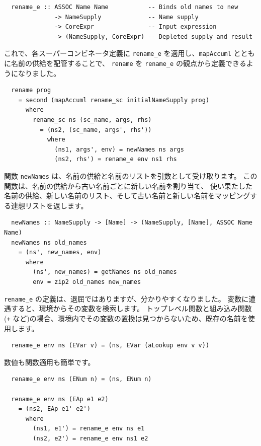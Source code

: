 \documentclass{jbook}
\begin{document}
\begin{verbatim}
  rename_e :: ASSOC Name Name           -- Binds old names to new
              -> NameSupply             -- Name supply
              -> CoreExpr               -- Input expression
              -> (NameSupply, CoreExpr) -- Depleted supply and result
\end{verbatim}

これで、各スーパーコンビネータ定義に \texttt{rename\_e} を適用し、\texttt{mapAccuml} とともに名前の供給を配管することで、
\texttt{rename} を \texttt{rename\_e} の観点から定義できるようになりました。

\begin{verbatim}
  rename prog
    = second (mapAccuml rename_sc initialNameSupply prog)
      where
        rename_sc ns (sc_name, args, rhs)
          = (ns2, (sc_name, args', rhs'))
            where
              (ns1, args', env) = newNames ns args
              (ns2, rhs') = rename_e env ns1 rhs
\end{verbatim}

関数 \texttt{newNames} は、名前の供給と名前のリストを引数として受け取ります。
この関数は、名前の供給から古い名前ごとに新しい名前を割り当て、
使い果たした名前の供給、新しい名前のリスト、そして古い名前と新しい名前をマッピングする連想リストを返します。

\begin{verbatim}
  newNames :: NameSupply -> [Name] -> (NameSupply, [Name], ASSOC Name Name)
  newNames ns old_names
    = (ns', new_names, env)
      where
        (ns', new_names) = getNames ns old_names
        env = zip2 old_names new_names
\end{verbatim}

\texttt{rename\_e} の定義は、退屈ではありますが、分かりやすくなりました。
変数に遭遇すると、環境からその変数を検索します。
トップレベル関数と組み込み関数(\texttt{+} など)の場合、環境内でその変数の置換は見つからないため、既存の名前を使用します。

\begin{verbatim}
  rename_e env ns (EVar v) = (ns, EVar (aLookup env v v))
\end{verbatim}

数値も関数適用も簡単です。

\begin{verbatim}
  rename_e env ns (ENum n) = (ns, ENum n)

  rename_e env ns (EAp e1 e2)
    = (ns2, EAp e1' e2')
      where
        (ns1, e1') = rename_e env ns e1
        (ns2, e2') = rename_e env ns1 e2
\end{verbatim}
\end{document}
